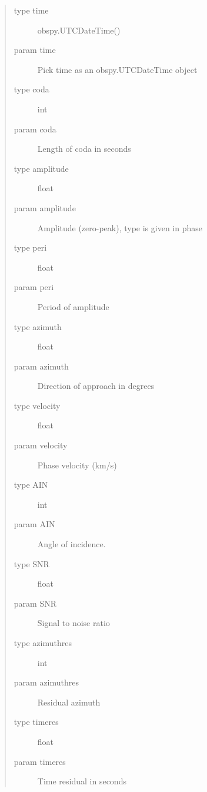 \documentclass[a4paper,10pt,english]{sphinxmanual}
\begin{document}
\begin{fulllineitems}
\begin{description}
\begin{quote}
\begin{description}
\item[{type time}] \leavevmode
obspy.UTCDateTime()

\item[{param time}] \leavevmode
Pick time as an obspy.UTCDateTime object

\item[{type coda}] \leavevmode
int

\item[{param coda}] \leavevmode
Length of coda in seconds

\item[{type amplitude}] \leavevmode
float

\item[{param amplitude}] \leavevmode
Amplitude (zero-peak), type is given in phase

\item[{type peri}] \leavevmode
float

\item[{param peri}] \leavevmode
Period of amplitude

\item[{type azimuth}] \leavevmode
float

\item[{param azimuth}] \leavevmode
Direction of approach in degrees

\item[{type velocity}] \leavevmode
float

\item[{param velocity}] \leavevmode
Phase velocity (km/s)

\item[{type AIN}] \leavevmode
int

\item[{param AIN}] \leavevmode
Angle of incidence.

\item[{type SNR}] \leavevmode
float

\item[{param SNR}] \leavevmode
Signal to noise ratio

\item[{type azimuthres}] \leavevmode
int

\item[{param azimuthres}] \leavevmode
Residual azimuth

\item[{type timeres}] \leavevmode
float

\item[{param timeres}] \leavevmode
Time residual in seconds


\end{description}
\end{quote}
\end{description}
\end{fulllineitems}
\end{document}
